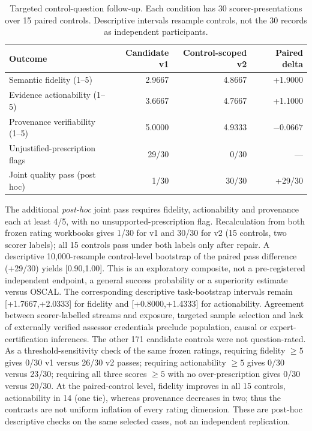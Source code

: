 \documentclass[12pt,a4paper]{article}
\begin{document}
\begin{table}[H]\centering\small
\caption{Targeted control-question follow-up. Each condition has 30 scorer-presentations over 15 paired controls. Descriptive intervals resample controls, not the 30 records as independent participants.}\label{tab:r018}
\begin{tabular}{@{}lrrr@{}}\toprule
Outcome & Candidate v1 & Control-scoped v2 & Paired delta \\\midrule
Semantic fidelity (1--5) & 2.9667 & 4.8667 & +1.9000 \\
Evidence actionability (1--5) & 3.6667 & 4.7667 & +1.1000 \\
Provenance verifiability (1--5) & 5.0000 & 4.9333 & $-0.0667$ \\
Unjustified-prescription flags & 29/30 & 0/30 & --- \\
Joint quality pass (post hoc) & 1/30 & 30/30 & +29/30 \\
\bottomrule\end{tabular}\end{table}

The additional \emph{post-hoc} joint pass requires fidelity, actionability and provenance each at least 4/5, with no unsupported-prescription flag. Recalculation from both frozen rating workbooks gives 1/30 for v1 and 30/30 for v2 (15 controls, two scorer labels); all 15 controls pass under both labels only after repair. A descriptive 10,000-resample control-level bootstrap of the paired pass difference (+29/30) yields [0.90,1.00]. This is an exploratory composite, not a pre-registered independent endpoint, a general success probability or a superiority estimate versus OSCAL. The corresponding descriptive task-bootstrap intervals remain [+1.7667,+2.0333] for fidelity and [+0.8000,+1.4333] for actionability. Agreement between scorer-labelled streams and exposure, targeted sample selection and lack of externally verified assessor credentials preclude population, causal or expert-certification inferences. The other 171 candidate controls were not question-rated. As a threshold-sensitivity check of the same frozen ratings, requiring fidelity $\geq5$ gives 0/30 v1 versus 26/30 v2 passes; requiring actionability $\geq5$ gives 0/30 versus 23/30; requiring all three scores $\geq5$ with no over-prescription gives 0/30 versus 20/30. At the paired-control level, fidelity improves in all 15 controls, actionability in 14 (one tie), whereas provenance decreases in two; thus the contrasts are not uniform inflation of every rating dimension. These are post-hoc descriptive checks on the same selected cases, not an independent replication.
\end{document}
